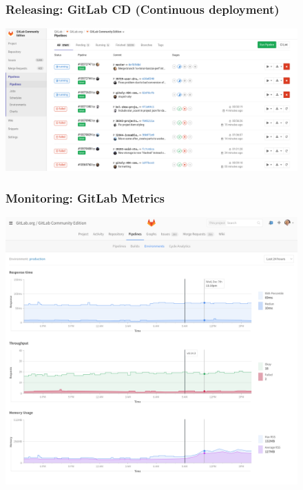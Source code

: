 \documentclass[notes]{beamer}
\begin{document}
\begin{frame}
  \begin{figure}
    \frametitle{Releasing: GitLab CD (Continuous deployment)}
    \centering
    \includegraphics[scale=0.165]{cd.png}
  \end{figure}
\end{frame}

\begin{frame}
  \begin{figure}
    \frametitle{Monitoring: GitLab Metrics}
    \centering
    \includegraphics[scale=0.10]{monitoring.png}
  \end{figure}
\end{frame}

\begin{frame}
  \titlepage
\end{frame}
\end{document}
